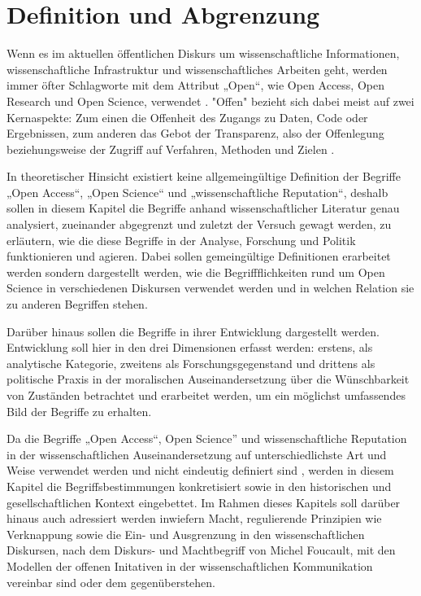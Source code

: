 \chapter{Definition und Abgrenzung} 
Wenn es im aktuellen öffentlichen Diskurs um wissenschaftliche Informationen, wissenschaftliche Infrastruktur und wissenschaftliches Arbeiten geht, werden immer öfter Schlagworte mit dem Attribut „Open“, wie Open Access, Open Research und Open Science, verwendet \cite{bunz_2014} \cite{schulze_2013_open}. "Offen" bezieht sich dabei meist auf zwei Kernaspekte: Zum einen die Offenheit des Zugangs zu Daten, Code oder Ergebnissen, zum anderen das Gebot der Transparenz, also der Offenlegung beziehungsweise der Zugriff auf Verfahren, Methoden und Zielen \cite{schulze_2013_open}.

In theoretischer Hinsicht existiert keine allgemeingültige Definition der Begriffe „Open Access“, „Open Science“ und „wissenschaftliche Reputation“, deshalb sollen in diesem Kapitel die Begriffe anhand wissenschaftlicher Literatur genau analysiert, zueinander abgegrenzt und zuletzt der Versuch gewagt werden, zu erläutern, wie die diese Begriffe in der Analyse, Forschung und Politik funktionieren und agieren. Dabei sollen gemeingültige Definitionen erarbeitet werden sondern dargestellt werden, wie die Begriffflichkeiten rund um Open Science in verschiedenen Diskursen verwendet werden und in welchen Relation sie zu anderen Begriffen stehen.

Darüber hinaus sollen die Begriffe in ihrer Entwicklung dargestellt werden. Entwicklung soll hier in den drei Dimensionen erfasst werden: erstens, als analytische Kategorie, zweitens als Forschungsgegenstand und drittens als politische Praxis in der moralischen Auseinandersetzung über die Wünschbarkeit von Zuständen betrachtet und erarbeitet werden, um ein möglichst umfassendes Bild der Begriffe zu erhalten. \cite{cite:10}

Da die Begriffe „Open Access“, Open Science” und wissenschaftliche Reputation in der wissenschaftlichen Auseinandersetzung auf unterschiedlichste Art und Weise verwendet werden und nicht eindeutig definiert sind \cite{cite:9}, werden in diesem Kapitel die Begriffsbestimmungen konkretisiert sowie in den historischen und gesellschaftlichen Kontext eingebettet.
Im Rahmen dieses Kapitels soll darüber hinaus auch adressiert werden inwiefern Macht, regulierende Prinzipien wie Verknappung sowie die Ein- und Ausgrenzung in den wissenschaftlichen Diskursen, nach dem Diskurs- und Machtbegriff  von Michel Foucault, mit den Modellen der offenen Initativen in der wissenschaftlichen Kommunikation vereinbar sind oder dem gegenüberstehen.

